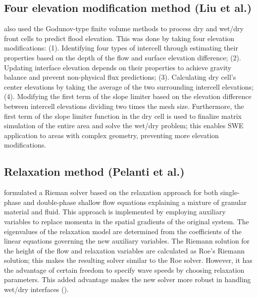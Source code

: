 \documentclass[10pt,a4paper]{article}
\newcommand{\donna}[1]{{\color{red}{#1}}}
\begin{document}
\donna{Below, we describe different methods that appear in the literature for handling the wetting and drying problem.}

	\subsection{Four elevation modification  method (Liu et al.)}
		\citet{li-ta-wa-ca-ba-ch-li:2021} also used the Godunov-type finite volume methods to process dry and wet/dry front cells to predict flood elevation. This was done by taking four elevation modifications: (1).  Identifying four types of intercell through estimating their properties based on the depth of the flow and surface elevation difference; (2). Updating interface elevation depends on their properties to achieve gravity balance and prevent non-physical flux predictions;  (3).  Calculating dry cell's center elevations by taking the average of the two surrounding intercell elevations; (4). Modifying the first term of the slope limiter based on the elevation difference between intercell elevations dividing two times the mesh size. Furthermore, the first term of the slope limiter function in the dry cell is used to finalize matrix simulation of the entire area and solve the wet/dry problem; this enables SWE application to areas with complex geometry, preventing more elevation modifications.
	
	\subsection{Relaxation method (Pelanti et al.)}

 \citet{pelanti2011riemann} formulated a Rieman solver based on the relaxation approach for both single-phase and double-phase shallow flow equations explaining a mixture of granular material and fluid. This approach is implemented by employing auxiliary variables to replace momenta in the spatial gradients of the original system. The eigenvalues of the relaxation model are determined from the coefficients of the linear equations governing the new auxiliary variables.  The Riemann solution for the height of the flow and relaxation variables are calculated as Roe's Riemann solution; this makes the resulting solver similar to the Roe solver. However, it has the advantage of certain freedom to specify wave speeds by choosing relaxation parameters. This added advantage makes the new solver more robust in handling wet/dry interfaces (\cite{pelanti2008relaxation,pelanti2011riemann}).
\end{document}
